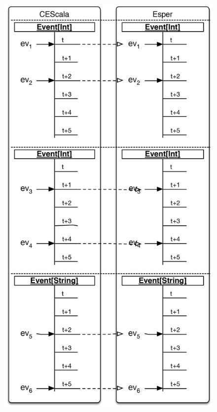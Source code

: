 \documentclass[book,type=bsc,colorback,accentcolor=tud8b,12pt,twoside]{tudthesis}
\begin{document}
\begin{figure}[tp]
\centering
\begin{minipage}{.5\textwidth}
  \centering
  \includegraphics[width=.96\linewidth]{Resources/Figures/separate_streams}
  \label{fig:separate-streams}
\end{minipage}%
\begin{minipage}{.5\textwidth}

\end{minipage}
\end{figure}
\end{document}
